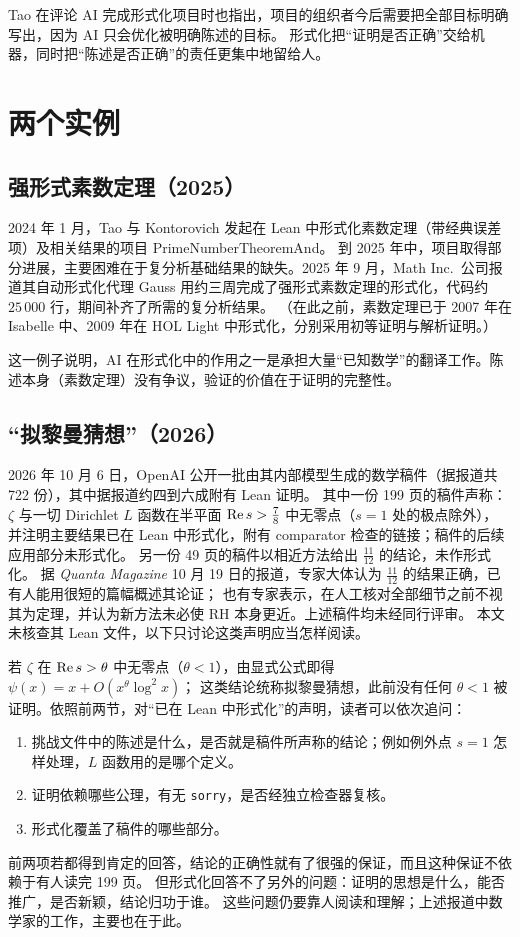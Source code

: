 \documentclass[11pt]{article}
\begin{document}
Tao 在评论 AI 完成形式化项目时也指出，项目的组织者今后需要把全部目标明确写出，因为 AI 只会优化被明确陈述的目标。
形式化把“证明是否正确”交给机器，同时把“陈述是否正确”的责任更集中地留给人。

\section{两个实例}
\subsection{强形式素数定理（2025）}
2024 年 1 月，Tao 与 Kontorovich 发起在 Lean 中形式化素数定理（带经典误差项）及相关结果的项目 PrimeNumberTheoremAnd。
到 2025 年中，项目取得部分进展，主要困难在于复分析基础结果的缺失。2025 年 9 月，Math Inc.\ 公司报道其自动形式化代理 Gauss
用约三周完成了强形式素数定理的形式化，代码约 $25\,000$ 行，期间补齐了所需的复分析结果。
（在此之前，素数定理已于 2007 年在 Isabelle 中、2009 年在 HOL Light 中形式化，分别采用初等证明与解析证明。）

这一例子说明，AI 在形式化中的作用之一是承担大量“已知数学”的翻译工作。陈述本身（素数定理）没有争议，验证的价值在于证明的完整性。

\subsection{“拟黎曼猜想”（2026）}
2026 年 10 月 6 日，OpenAI 公开一批由其内部模型生成的数学稿件（据报道共 722 份），其中据报道约四到六成附有 Lean 证明。
其中一份 199 页的稿件声称：$\zeta$ 与一切 Dirichlet $L$ 函数在半平面 $\operatorname{Re} s>\tfrac78$ 中无零点（$s=1$ 处的极点除外），
并注明主要结果已在 Lean 中形式化，附有 comparator 检查的链接；稿件的后续应用部分未形式化。
另一份 49 页的稿件以相近方法给出 $\tfrac{11}{12}$ 的结论，未作形式化。
据 \emph{Quanta Magazine} 10 月 19 日的报道，专家大体认为 $\tfrac{11}{12}$ 的结果正确，已有人能用很短的篇幅概述其论证；
也有专家表示，在人工核对全部细节之前不视其为定理，并认为新方法未必使 RH 本身更近。上述稿件均未经同行评审。
本文未核查其 Lean 文件，以下只讨论这类声明应当怎样阅读。

若 $\zeta$ 在 $\operatorname{Re} s>\theta$ 中无零点（$\theta<1$），由显式公式即得 $\psi(x)=x+O(x^{\theta}\log^2x)$；
这类结论统称拟黎曼猜想，此前没有任何 $\theta<1$ 被证明。依照前两节，对“已在 Lean 中形式化”的声明，读者可以依次追问：
\begin{enumerate}
 \item 挑战文件中的陈述是什么，是否就是稿件所声称的结论；例如例外点 $s=1$ 怎样处理，$L$ 函数用的是哪个定义。
 \item 证明依赖哪些公理，有无 \texttt{sorry}，是否经独立检查器复核。
 \item 形式化覆盖了稿件的哪些部分。
\end{enumerate}
前两项若都得到肯定的回答，结论的正确性就有了很强的保证，而且这种保证不依赖于有人读完 199 页。
但形式化回答不了另外的问题：证明的思想是什么，能否推广，是否新颖，结论归功于谁。
这些问题仍要靠人阅读和理解；上述报道中数学家的工作，主要也在于此。
\end{document}
